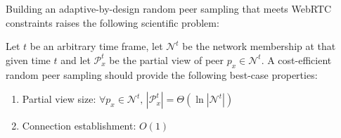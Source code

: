 
Building an adaptive-by-design random peer sampling that meets WebRTC
constraints raises the following scientific problem:
\begin{problem}
  Let $t$ be an arbitrary time frame, let $\mathcal{N}^t$ be the network
  membership at that given time $t$ and let $\mathcal{P}_x^t$ be the partial
  view of peer $p_x \in \mathcal{N}^t$.  A cost-efficient random peer sampling
  should provide the following best-case properties:
  \begin{enumerate}
  \item Partial view size: \hfill
    $\forall p_x \in \mathcal{N}^t,\, |\mathcal{P}_x^t| = \Theta (\ln
    |\mathcal{N}^t|)$      
  \item Connection establishment: \hfill $O(1)$
  \end{enumerate}
\end{problem}

